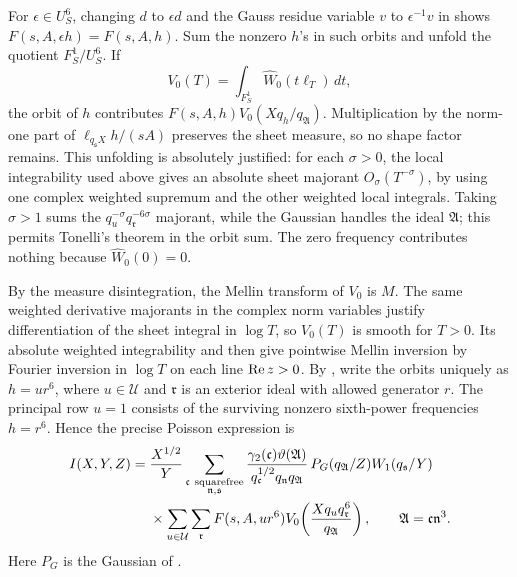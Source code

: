 For \(\epsilon\in U_S^6\), changing \(d\) to \(\epsilon d\) and the
Gauss residue variable \(v\) to \(\epsilon^{-1}v\) in
 shows
\(F(s,A,\epsilon h)=F(s,A,h)\).  Sum the nonzero \(h\)'s in such
orbits and unfold the quotient \(F_S^1/U_S^6\).  If
\[
 V_0(T)=\int_{F_S^1}\widehat W_0(t\ell_T)\,dt,
\]
the orbit of \(h\) contributes
\(F(s,A,h)V_0(Xq_h/q_{\mathfrak A})\).  Multiplication by the norm-one
part of \(\ell_{q_{\mathfrak s}X}h/(sA)\) preserves the sheet measure, so
no shape factor remains.  This unfolding is absolutely justified: for
each \(\sigma>0\), the local integrability used above gives an absolute
sheet majorant \(O_\sigma(T^{-\sigma})\), by using one complex weighted
supremum and the other weighted local integrals.  Taking \(\sigma>1\)
sums the \(q_u^{-\sigma}q_{\mathfrak r}^{-6\sigma}\) majorant, while
the Gaussian handles the ideal \(\mathfrak A\); this permits Tonelli's
theorem in the orbit sum.  The zero frequency contributes
nothing because \(\widehat W_0(0)=0\).

By the measure disintegration, the Mellin transform of \(V_0\) is \(M\).
The same weighted derivative majorants in the complex norm variables
justify differentiation of the sheet integral in \(\log T\), so
\(V_0(T)\) is smooth for \(T>0\).  Its absolute weighted integrability
and  then give pointwise Mellin inversion by
Fourier inversion in \(\log T\) on each line \(\operatorname{Re} z>0\).
By , write the orbits uniquely as
\(h=ur^6\), where \(u\in\mathcal U\) and \(\mathfrak r\) is an exterior
ideal with allowed generator \(r\).  The principal row \(u=1\) consists
of the surviving nonzero sixth-power frequencies \(h=r^6\).  Hence the
precise Poisson expression is
\begin{equation}
 \begin{split}
 I(X,Y,Z)
  ={}&\frac{X^{1/2}}Y
   \sum_{\substack{\mathfrak c\ {\rm squarefree}\\
                    \mathfrak n,\mathfrak s}}
   \frac{\gamma_2(\mathfrak c)\vartheta(\mathfrak A)}
        {q_{\mathfrak c}^{1/2}q_{\mathfrak n}q_{\mathfrak A}}\,
   P_G(q_{\mathfrak A}/Z)W_1(q_{\mathfrak s}/Y)\\
  &{}\times
   \sum_{u\in\mathcal U}\sum_{\mathfrak r}
     F(s,A,ur^6)
     V_0\!\left(\frac{Xq_uq_{\mathfrak r}^6}{q_{\mathfrak A}}\right),
 \qquad \mathfrak A=\mathfrak c\mathfrak n^3.
 \end{split}
\label{eq:Poisson-orbits}
\end{equation}
Here \(P_G\) is the Gaussian of .

